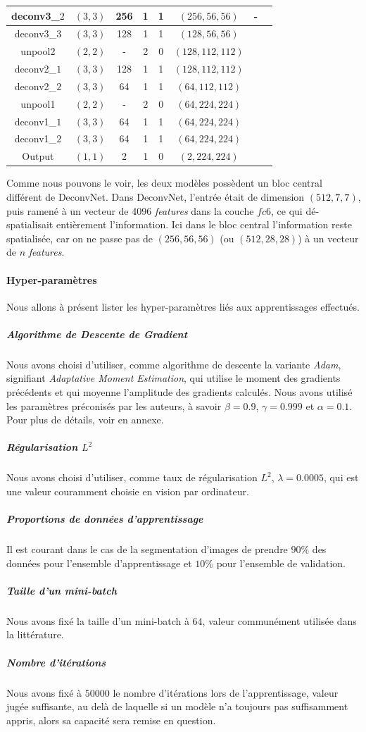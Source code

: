 \documentclass[a4paper, 11pt]{report}
\begin{document}
\begin{center}
\begin{tabular}{|c|c|c|c|c|c|c|c|}
	\hline
	deconv3\_$2$ & $(3, 3)$ & 256 & 1 & 1 & $(256, 56, 56)$ & - & \checkmark \\
	\hline
	deconv3\_$3$ & $(3, 3)$ & 128 & 1 & 1 & $(128, 56, 56)$ & \checkmark & \checkmark \\
	\hline
	unpool2 & $(2, 2)$ & - & 2 & 0 & $(128, 112, 112)$ & \checkmark & \checkmark \\
	\hline
	deconv2\_$1$ & $(3, 3)$ & 128 & 1 & 1 & $(128, 112, 112)$ & \checkmark & \checkmark \\
	\hline
	deconv2\_$2$ & $(3, 3)$ & 64 & 1 & 1 & $(64, 112, 112)$ & \checkmark & \checkmark \\
	\hline
	unpool1 & $(2, 2)$ & - & 2 & 0 & $(64, 224, 224)$ & \checkmark & \checkmark \\
	\hline
	deconv1\_$1$ & $(3, 3)$ & 64 & 1 & 1 & $(64, 224, 224)$ & \checkmark & \checkmark \\
	\hline
	deconv1\_$2$ & $(3, 3)$ & 64 & 1 & 1 & $(64, 224, 224)$ & \checkmark & \checkmark \\
	\hline
	Output & $(1, 1)$ & 2 & 1 & 0 & $(2, 224, 224)$ & \checkmark & \checkmark \\
	\hline
	\end{tabular} 
\end{center}

Comme nous pouvons le voir, les deux modèles possèdent un bloc central différent de DeconvNet.
Dans DeconvNet, l'entrée était de dimension $(512, 7, 7)$, puis ramené à un vecteur de 4096 \emph{features} dans la couche $fc6$, ce qui dé-spatialisait entièrement l'information.
Ici dans le bloc central l'information reste spatialisée, car on ne passe pas de $(256, 56, 56)$ (ou $(512, 28, 28)$) à un vecteur de $n$ \emph{features}.

\paragraph{Hyper-paramètres}
Nous allons à présent lister les hyper-paramètres liés aux apprentissages effectués.
\subparagraph{Algorithme de Descente de Gradient}
Nous avons choisi d'utiliser, comme algorithme de descente la variante \emph{Adam}, signifiant \emph{Adaptative Moment Estimation}, qui utilise le moment des gradients précédents et qui moyenne l'amplitude des gradients calculés.
Nous avons utilisé les paramètres préconisés par les auteurs, à savoir $\beta = 0.9$, $\gamma = 0.999$ et $\alpha = 0.1$.
Pour plus de détails, voir en annexe.
\subparagraph{Régularisation $L^2$}
Nous avons choisi d'utiliser, comme taux de régularisation $L^2$, $\lambda = 0.0005$, qui est une valeur couramment choisie en vision par ordinateur.
\subparagraph{Proportions de données d'apprentissage}
Il est courant dans le cas de la segmentation d'images de prendre $90\%$ des données pour l'ensemble d'apprentissage et $10\%$ pour l'ensemble de validation.
\subparagraph{Taille d'un \emph{mini-batch}}
Nous avons fixé la taille d'un mini-batch à $64$, valeur communément utilisée dans la littérature.
\subparagraph{Nombre d'itérations}
Nous avons fixé à $50000$ le nombre d'itérations lors de l'apprentissage, valeur jugée suffisante, au delà de laquelle si un modèle n'a toujours pas suffisamment appris, alors sa capacité sera remise en question.
\end{document}
